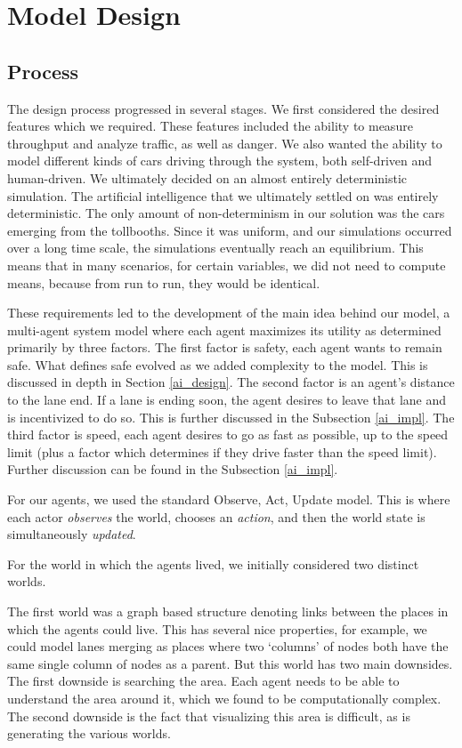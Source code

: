 \documentclass[a4paper, 11pt]{article}
\begin{document}
\section{Model Design}
\label{model_design}

\subsection{Process}

The design process progressed in several stages. We first considered the desired features which we required. These features included the ability to measure throughput and analyze traffic, as well as danger. We also wanted the ability to model different kinds of cars driving through the system, both self-driven and human-driven. We ultimately decided on an almost entirely deterministic simulation. The artificial intelligence that we ultimately settled on was entirely deterministic. The only amount of non-determinism in our solution was the cars emerging from the tollbooths. Since it was uniform, and our simulations occurred over a long time scale, the simulations eventually reach an equilibrium. This means that in many scenarios, for certain variables, we did not need to compute means, because from run to run, they would be identical. 

These requirements led to the development of the main idea behind our model, a multi-agent system model where each agent maximizes its utility as determined primarily by three factors. 
The first factor is safety, each agent wants to remain safe. What defines safe evolved as we added complexity to the model. This is discussed in depth in Section \ref{ai_design}. 
The second factor is an agent's distance to the lane end. If a lane is ending soon, the agent desires to leave that lane and is incentivized to do so. This is further discussed in the Subsection \ref{ai_impl}.  
The third factor is speed, each agent desires to go as fast as possible, up to the speed limit (plus a factor which determines if they drive faster than the speed limit). Further discussion can be found in the Subsection \ref{ai_impl}. 

For our agents, we used the standard Observe, Act, Update model. This is where each actor \textit{observes} the world, chooses an \textit{action}, and then the world state is simultaneously \textit{updated}.  

For the world in which the agents lived, we initially considered two distinct worlds. 

The first world was a graph based structure denoting links between the places in which the agents could live. This has several nice properties, for example, we could model lanes merging as places where two `columns' of nodes both have the same single column of nodes as a parent. 
But this world has two main downsides. The first downside is searching the area. Each agent needs to be able to understand the area around it, which we found to be computationally complex. The second downside is the fact that visualizing this area is difficult, as is generating the various worlds. 
\end{document}
